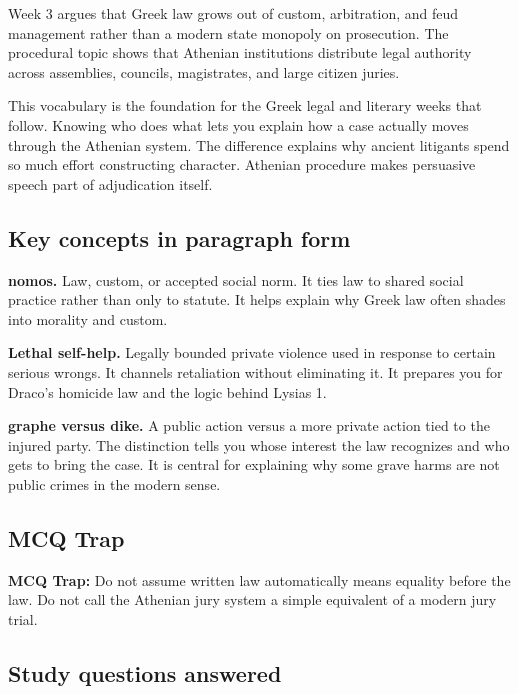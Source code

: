 \documentclass[11pt]{article}
\begin{document}
Week 3 argues that Greek law grows out of custom, arbitration, and feud management rather than a modern state monopoly on prosecution. The procedural topic shows that Athenian institutions distribute legal authority across assemblies, councils, magistrates, and large citizen juries.

This vocabulary is the foundation for the Greek legal and literary weeks that follow. Knowing who does what lets you explain how a case actually moves through the Athenian system. The difference explains why ancient litigants spend so much effort constructing character. Athenian procedure makes persuasive speech part of adjudication itself.

\subsection{Key concepts in paragraph form}

\textbf{nomos.} Law, custom, or accepted social norm. It ties law to shared social practice rather than only to statute. It helps explain why Greek law often shades into morality and custom.

\textbf{Lethal self-help.} Legally bounded private violence used in response to certain serious wrongs. It channels retaliation without eliminating it. It prepares you for Draco's homicide law and the logic behind Lysias 1.

\textbf{graphe versus dike.} A public action versus a more private action tied to the injured party. The distinction tells you whose interest the law recognizes and who gets to bring the case. It is central for explaining why some grave harms are not public crimes in the modern sense.

\subsection{MCQ Trap}

\begin{quotebox}
\textbf{MCQ Trap:} Do not assume written law automatically means equality before the law. Do not call the Athenian jury system a simple equivalent of a modern jury trial.
\end{quotebox}

\subsection{Study questions answered}
\end{document}

